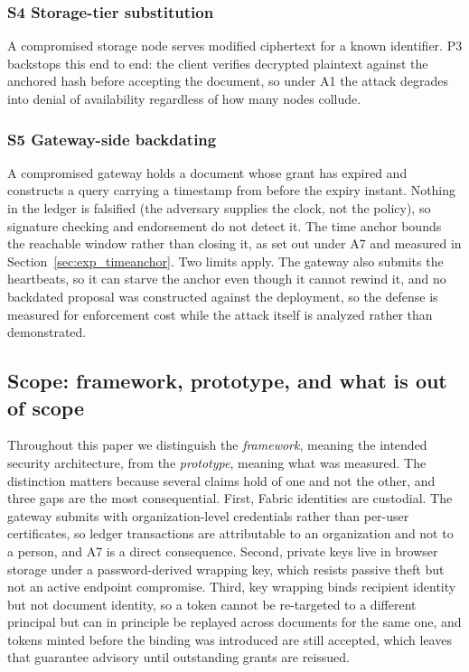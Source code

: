 \documentclass[preprint,12pt]{elsarticle}
\begin{document}
\subsubsection{S4 Storage-tier substitution}
A compromised storage node serves modified ciphertext for a known identifier. P3
backstops this end to end: the client verifies decrypted plaintext against
the anchored hash before accepting the document, so under A1 the attack degrades
into denial of availability regardless of how many nodes collude.

\subsubsection{S5 Gateway-side backdating}
A compromised gateway holds a document whose grant has expired and constructs a
query carrying a timestamp from before the expiry instant. Nothing in the ledger is
falsified (the adversary supplies the clock, not the policy), so signature checking and endorsement do not detect it. The time anchor bounds the
reachable window rather than closing it, as set out under A7 and measured in
Section~\ref{sec:exp_timeanchor}. Two limits apply. The gateway also submits
the heartbeats, so it can starve the anchor even though it cannot rewind it,
and no backdated proposal was constructed against the deployment, so the
defense is measured for enforcement cost while the attack itself is analyzed
rather than demonstrated.

\subsection{Scope: framework, prototype, and what is out of scope}
\label{sec:scope}

Throughout this paper we distinguish the \emph{framework}, meaning the
intended security architecture, from the \emph{prototype}, meaning what was
measured. The distinction matters because several claims hold of one and not
the other, and three gaps are the most consequential. First, Fabric identities
are custodial. The gateway submits with organization-level credentials rather
than per-user certificates, so ledger transactions are attributable to an
organization and not to a person, and A7 is a direct consequence. Second,
private keys live in browser storage under a password-derived wrapping key,
which resists passive theft but not an active endpoint compromise. Third, key
wrapping binds recipient identity but not document identity, so a token cannot
be re-targeted to a different principal but can in principle be replayed across
documents for the same one, and tokens minted before the binding was introduced
are still accepted, which leaves that guarantee advisory until outstanding
grants are reissued.
\end{document}
